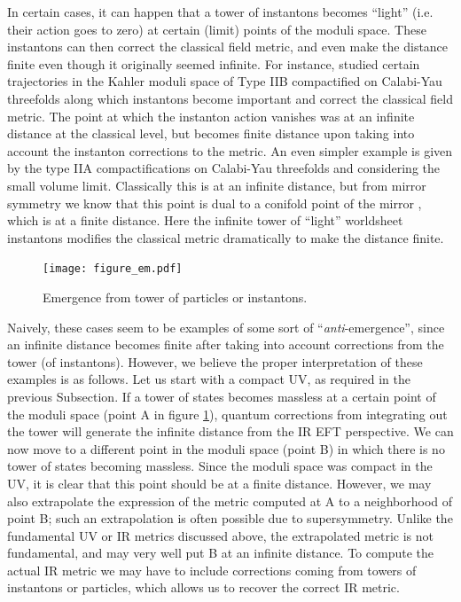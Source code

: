 \documentclass[11pt]{article}
\numberwithin{equation}{section}
\numberwithin{equation}{section}
\theoremstyle{remark}
\begin{document}
In certain cases, it can happen that a tower of instantons becomes ``light'' (i.e. their action goes to zero) at certain (limit) points of the moduli space. These instantons can then correct the classical field metric, and even make the distance finite even though it originally seemed infinite. For instance, \cite{Marchesano:2019ifh} studied certain trajectories in the Kahler moduli space of Type IIB compactified on Calabi-Yau threefolds along which instantons become important and correct the classical field metric. The point at which the instanton action vanishes was at an infinite distance at the classical level, but becomes finite distance upon taking into account the instanton corrections to the metric.   An even simpler example is given by the type IIA compactifications on Calabi-Yau threefolds and considering the small volume limit.
Classically this is at an infinite distance, but from mirror symmetry we know that this point is dual to a conifold point of the mirror \cite{Candelas:1989ug,Candelas:1990rm}, which is at a finite distance.  Here the infinite tower of ``light'' worldsheet instantons modifies the classical metric dramatically to make the distance finite.

 \begin{figure}[ht!]
	\centering{}\texttt{[image: figure\_em.pdf]} \
	\caption{Emergence from tower of particles or instantons.}
	\label{fig:emerg}
\end{figure}
Naively, these cases seem to be examples of some sort of ``\emph{anti}-emergence'', since an infinite distance becomes finite after taking into account corrections from the tower (of instantons). However, we believe the proper interpretation of these examples is as follows. Let us start with a compact UV, as required in the previous Subsection. If a tower of states becomes massless at a certain point of the moduli space (point A in figure \ref{fig:emerg}), quantum corrections from integrating out the tower will generate the infinite distance from the IR EFT perspective. We can now move to a different point in the moduli space (point B) in which there is no tower of states becoming massless. Since the moduli space was compact in the UV, it is clear that this point should be at a finite distance. 
However, we may also extrapolate the expression of the metric computed at A to a neighborhood of point B; such an extrapolation is often possible due to supersymmetry. Unlike the fundamental UV or IR metrics discussed above, the extrapolated metric is not fundamental, and may very well put B at an infinite distance. To compute the actual IR metric we may have to include corrections coming from towers of instantons or particles, which allows us to recover the correct IR metric. 
\end{document}
